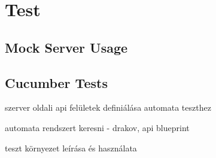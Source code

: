 \chapter{Test}
\label{7-test}

\section{Mock Server Usage}
\label{mock-server-usage}
\section{Cucumber Tests}
\label{cucumber-test}
szerver oldali api felületek definiálása automata teszthez

automata rendszert keresni - drakov, api blueprint

teszt környezet leírása és használata